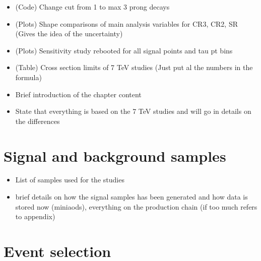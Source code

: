 
\begin{itemize}
	\item (Code) Change cut from 1 to max 3 prong decays
	\item (Plots) Shape comparisons of main analysis variables for CR3, CR2, SR (Gives the idea of the uncertainty)
	\item (Plots) Sensitivity study rebooted for all signal points and tau pt bins
	\item (Table) Cross section limits of 7 TeV studies (Just put al the numbers in the formula)
\end{itemize}


\begin{itemize}
	\item Brief introduction of the chapter content
	\item State that everything is based on the 7 TeV studies and will go in details on the differences
\end{itemize}


\section{Signal and background samples}

\begin{itemize}
	\item List of samples used for the studies
	\item brief details on how the signal samples has been generated and how data is stored now (miniaods), everything on the production chain (if too much refers to appendix)
\end{itemize}

\section{Event selection}

